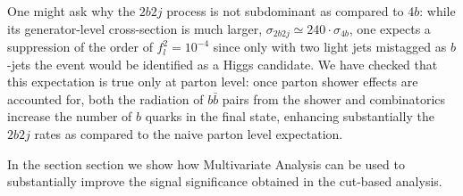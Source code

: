   One might ask why the $2b2j$ process
  is not subdominant as compared to $4b$: while its generator-level cross-section is
  much larger, $\sigma_{2b2j} \simeq 240\cdot \sigma_{4b}$, one expects a suppression
  of the order of $f_l^2 =10^{-4}$ since only with two light jets mistagged as $b$-jets the event
  would be identified as a Higgs candidate.
  We have checked that this expectation is true only at parton level: once parton shower effects
  are accounted for, both the radiation of $b\bar{b}$ pairs from the shower and combinatorics increase
  the number of $b$ quarks in the final state, enhancing substantially the $2b2j$ rates as compared
  to the naive parton level expectation.

  In the section section we show how Multivariate Analysis can be used
  to substantially improve the signal significance obtained in the
  cut-based analysis.





